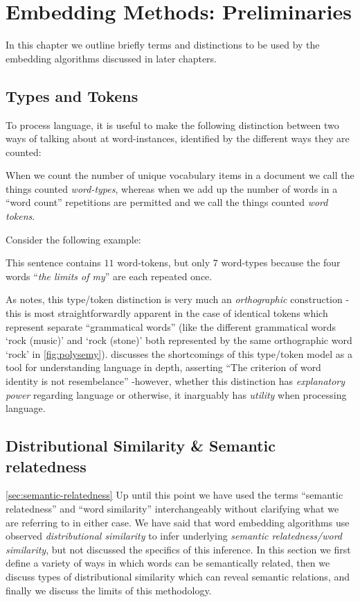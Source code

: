 \chapter{Embedding Methods: Preliminaries}
In this chapter we outline briefly terms and distinctions to be used by the embedding algorithms discussed in later chapters.

\section{Types and Tokens}
To process language, it is useful to make the following distinction between two ways of talking about at word-instances, identified by the different ways they are counted:
\begin{definition}
  When we count the number of unique vocabulary items in a document we call the things counted \emph{word-types}, whereas when we add up the number of words in a ``word count'' repetitions are permitted and we call the things counted \emph{word tokens}.
\end{definition}
Consider the following example:
\begin{example}\par
\phantom{line}
This sentence contains $11$ word-tokens, but only $7$ word-types because the four words ``\emph{the limits of my}'' are each repeated once.
\end{example}
As \textcite{kaplan-1990-words} notes, this type/token distinction is very much an \emph{orthographic} construction -this is most straightforwardly apparent in the case of identical tokens which represent separate ``grammatical words'' (like the different grammatical words `rock (music)' and `rock (stone)' both represented by the same orthographic word `rock' in \autoref{fig:polysemy}). \citeauthor{kaplan-1990-words} discusses the shortcomings of this type/token model as a tool for understanding language in depth, asserting ``The criterion of word identity is not resembelance'' -however, whether this distinction has \emph{explanatory power} regarding language or otherwise, it inarguably has \emph{utility} when processing language.

\section{Distributional Similarity \& Semantic relatedness}\autoref{sec:semantic-relatedness}
Up until this point we have used the terms ``semantic relatedness'' and ``word similarity'' interchangeably without clarifying what we are referring to in either case. We have said that word embedding algorithms use observed \emph{distributional similarity} to infer underlying \emph{semantic relatedness/word similarity}, but not discussed the specifics of this inference. In this section we first define a variety of ways in which words can be semantically related, then we discuss types of distributional similarity which can reveal semantic relations, and finally we discuss the limits of this methodology.

